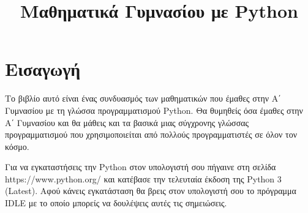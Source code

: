 \documentclass[b5paper,11pt,twoside,openleft]{memoir}
\begin{document}
\title{%
Μαθηματικά Γυμνασίου με Python}

\author{}
\maketitle
\thispagestyle{empty}
\chapter*	{Εισαγωγή}
Το βιβλίο αυτό είναι ένας συνδυασμός των μαθηματικών που έμαθες στην Α΄ Γυμνασίου με τη γλώσσα προγραμματισμού Python. Θα θυμηθείς όσα έμαθες στην Α΄ Γυμνασίου και θα μάθεις και τα βασικά μιας σύγχρονης γλώσσας προγραμματισμού που χρησιμοποιείται από πολλούς προγραμματιστές σε όλον τον κόσμο.

Για να εγκαταστήσεις την Python στον υπολογιστή σου πήγαινε στη σελίδα https://www.python.org/ και κατέβασε την τελευταία έκδοση της Python 3 (Latest). Αφού κάνεις εγκατάσταση θα βρεις στον υπολογιστή σου το πρόγραμμα IDLE με το οποίο μπορείς να δουλέψεις αυτές τις σημειώσεις.


%
%
%
%
%
%
%
%
\end{document}
